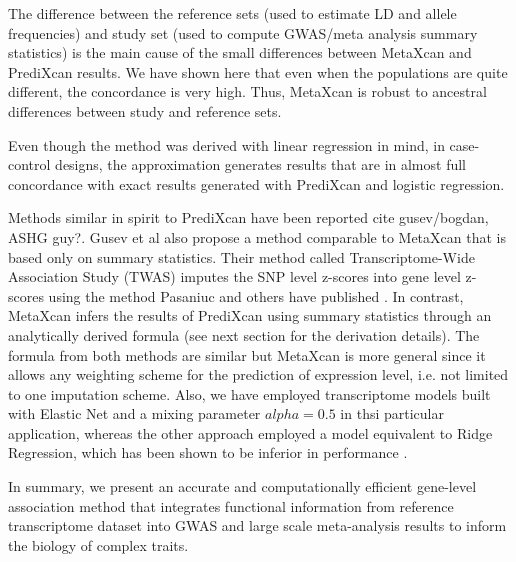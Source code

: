\documentclass[10pt]{article}
\begin{document}
The difference between the reference sets (used to estimate LD and allele frequencies) and study set (used to compute GWAS/meta analysis summary statistics) is the main cause of the small differences between MetaXcan and PrediXcan results. We have shown here that even when the populations are quite different, the concordance is very high. Thus, MetaXcan is robust to ancestral differences between study and reference sets.

Even though the method was derived with linear regression in mind, in case-control designs, the approximation generates results that are in almost full  concordance with exact results generated with PrediXcan and logistic regression.

Methods similar in spirit to PrediXcan have been reported cite{ gusev/bogdan, ASHG guy?}. Gusev et al also propose a method comparable to MetaXcan that is based only on summary statistics. Their method called Transcriptome-Wide Association Study (TWAS) imputes the SNP level z-scores into gene level z-scores using the method Pasaniuc and others have published \cite{pasaniuc}. In contrast, MetaXcan infers the results of PrediXcan using summary statistics through an analytically derived formula (see next section for the derivation details). The formula from both methods are similar but MetaXcan is more general since it allows any weighting scheme for the prediction of expression level, i.e. not limited to one imputation scheme. Also, we have employed transcriptome models built with Elastic Net and a mixing parameter $alpha = 0.5$ in thsi particular application, whereas the other approach employed a model equivalent to Ridge Regression, which has been shown to be inferior in performance \cite{Ridge Regression?}.
%
%
%


In summary, we present an accurate and computationally efficient gene-level association method that integrates functional information from reference transcriptome dataset into GWAS and large scale meta-analysis results to inform the biology of complex traits.
%
%
%
\end{document}
